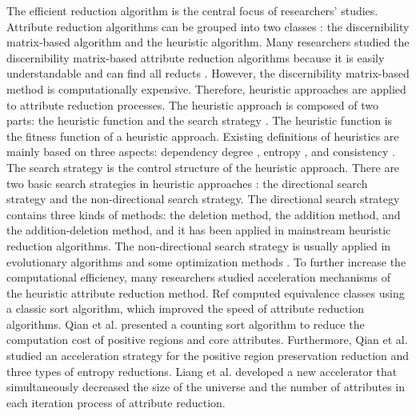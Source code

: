 \documentclass[review]{elsarticle}
\begin{document}
	\par The efficient reduction algorithm \cite{li2009approaches,meng2009fast,wei2010relation} is the central focus of researchers' studies. Attribute reduction algorithms can be grouped into two classes \cite{thangavel2009dimensionality}: the discernibility matrix-based algorithm \cite{skowron1992discernibility,skowron1991towards} and the heuristic algorithm. Many researchers studied the discernibility matrix-based attribute reduction algorithms because it is easily understandable and can find all reducts \cite{deng2006new,kryszkiewicz2001comparative,miao2009relative,wang2001reduction,xu2009efficient,yao2009discernibility,zhang2003knowledge,zhou2011analysis}. However, the discernibility matrix-based method is computationally expensive. Therefore, heuristic approaches are applied to attribute reduction processes. The heuristic approach is composed of two parts: the heuristic function and the search strategy \cite{yao2008reduct}. The heuristic function is the fitness function of a heuristic approach. Existing definitions of heuristics are mainly based on three aspects: dependency degree \cite{hu1995learning}, entropy \cite{Sun2017Continuous,tian2013rough,Yan2017Entropy}, and consistency \cite{Dash2003Consistency,Hu2007Consistency,li2014quick}. The search strategy is the control structure of the heuristic approach. There are two basic search strategies in heuristic approaches \cite{Wang1998Analysis}: the directional search strategy and the non-directional search strategy. The directional search strategy contains three kinds of methods: the deletion method, the addition method, and the addition-deletion method, and it has been applied in mainstream heuristic reduction algorithms. The non-directional search strategy is usually applied in evolutionary algorithms \cite{deng2009improved,jia2013minimum,ke2008efficient} and some optimization methods \cite{jensen2004semantics,yu2011solving}. To further increase the computational efficiency, many researchers studied acceleration mechanisms of the heuristic attribute reduction method. Ref \cite{ge2017quick,xu2006quick} computed equivalence classes using a classic sort algorithm, which improved the speed of attribute reduction algorithms. Qian et al. \cite{qian2011hybrid} presented a counting sort algorithm to reduce the computation cost of positive regions and core attributes. Furthermore, Qian et al. \cite{qian2010positive} studied an acceleration strategy for the positive region preservation reduction and three types of entropy reductions. Liang et al. \cite{liang2013accelerator} developed a new accelerator that simultaneously decreased the size of the universe and the number of attributes in each iteration process of attribute reduction.
	
\end{document}
